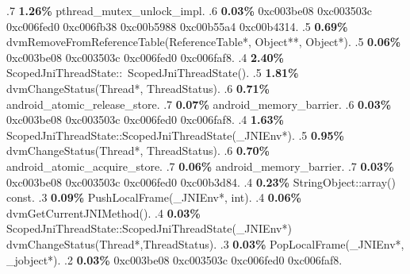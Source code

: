 \begin{profile}
{.7 \textbf{1.26\%} pthread\_mutex\_unlock\_impl. 
.6 \textbf{0.03\%} 0xc003be08\newline {} 0xc003503c\newline {} 0xc006fed0\newline {} 0xc006fb38\newline {} 0xc00b5988\newline {} 0xc00b55a4\newline {} 0xc00b4314. 
.5 \textbf{0.69\%} dvmRemoveFromReferenceTable(ReferenceTable*, Object**, Object*). 
.5 \textbf{0.06\%} 0xc003be08\newline {} 0xc003503c\newline {} 0xc006fed0\newline {} 0xc006faf8. 
.4 \textbf{2.40\%} ScopedJniThreadState::~ScopedJniThreadState(). 
.5 \textbf{1.81\%} dvmChangeStatus(Thread*, ThreadStatus). 
.6 \textbf{0.71\%} android\_atomic\_release\_store. 
.7 \textbf{0.07\%} android\_memory\_barrier. 
.6 \textbf{0.03\%} 0xc003be08\newline {} 0xc003503c\newline {} 0xc006fed0\newline {} 0xc006faf8. 
.4 \textbf{1.63\%} ScopedJniThreadState::ScopedJniThreadState(\_JNIEnv*). 
.5 \textbf{0.95\%} dvmChangeStatus(Thread*, ThreadStatus). 
.6 \textbf{0.70\%} android\_atomic\_acquire\_store. 
.7 \textbf{0.06\%} android\_memory\_barrier. 
.7 \textbf{0.03\%} 0xc003be08\newline {} 0xc003503c\newline {} 0xc006fed0\newline {} 0xc00b3d84. 
.4 \textbf{0.23\%} StringObject::array() const. 
.3 \textbf{0.09\%} PushLocalFrame(\_JNIEnv*, int). 
.4 \textbf{0.06\%} dvmGetCurrentJNIMethod(). 
.4 \textbf{0.03\%} ScopedJniThreadState::ScopedJniThreadState(\_JNIEnv*)\newline {} dvmChangeStatus(Thread*,ThreadStatus). 
.3 \textbf{0.03\%} PopLocalFrame(\_JNIEnv*, \_jobject*). 
.2 \textbf{0.03\%} 0xc003be08\newline {} 0xc003503c\newline {} 0xc006fed0\newline {} 0xc006faf8. 
}
\end{profile}

